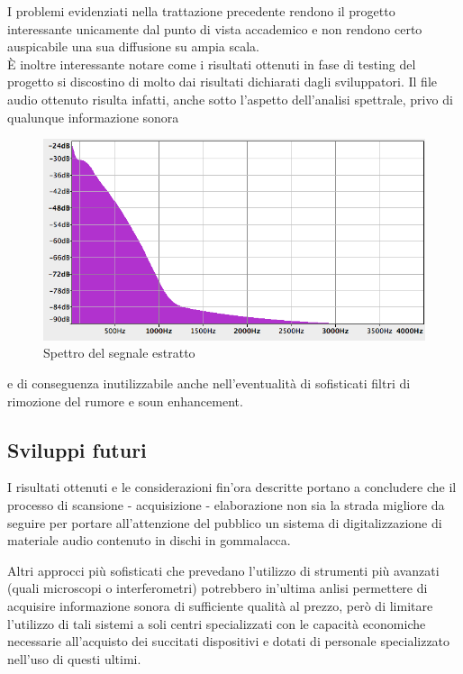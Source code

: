 I problemi evidenziati nella trattazione precedente rendono il progetto interessante unicamente dal punto di vista accademico e non rendono certo auspicabile una sua diffusione su ampia scala.\\
\`E inoltre interessante notare come i risultati ottenuti in fase di testing del progetto si discostino di molto dai risultati dichiarati dagli sviluppatori. Il file audio ottenuto risulta infatti, anche sotto l'aspetto dell'analisi spettrale, privo di qualunque informazione sonora
\begin{figure}[h!t]
\begin{center}
\includegraphics[scale=0.35]{./img/freq-domain.png}
\caption{Spettro del segnale estratto}
\end{center}
\end{figure}
 e di conseguenza inutilizzabile anche nell'eventualit\`a di sofisticati filtri di rimozione del rumore e soun enhancement.

\subsection{Sviluppi futuri}
I risultati ottenuti e le considerazioni fin'ora descritte portano a concludere che il processo di scansione - acquisizione - elaborazione non sia la strada migliore da seguire per portare all'attenzione del pubblico un sistema di digitalizzazione di materiale audio contenuto in dischi in gommalacca.

Altri approcci pi\`u sofisticati che prevedano l'utilizzo di strumenti pi\`u avanzati (quali microscopi o interferometri) potrebbero in'ultima anlisi permettere di acquisire informazione sonora di sufficiente qualit\`a al prezzo, per\`o di limitare l'utilizzo di tali sistemi a soli centri specializzati con le capacit\`a economiche necessarie all'acquisto dei succitati dispositivi e dotati di personale specializzato nell'uso di questi ultimi.